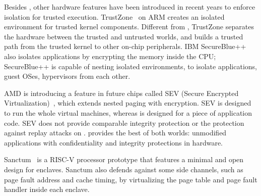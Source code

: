 Besides \sgx{}, other hardware features have been introduced in recent years to enforce isolation for trusted execution.
TrustZone~\cite{trustzone} on ARM
creates an isolated environment for trusted kernel components. 
Different from \sgx{}, TrustZone separates the hardware between the trusted and untrusted worlds,
and builds a trusted path from the trusted kernel to other on-chip peripherals.
IBM SecureBlue++~\cite{secureblue++} also isolates applications by encrypting the memory inside the CPU; SecureBlue++ is capable of nesting isolated environments, to isolate applications, guest OSes, hypervisors from each other.



AMD is introducing a feature in future chips called SEV (Secure Encrypted Virtualization)~\cite{amd-sme},
which extends nested paging with encryption.
SEV is designed to run the whole virtual machines, whereas \sgx{} is designed for 
a piece of application code.
SEV does not provide comparable integrity protection or the protection against replay attacks on \sgx{}.
\graphenesgx{} provides the best of both worlds: unmodified applications with confidentiality and integrity protections in hardware.




Sanctum~\cite{costan2016sanctum} is a RISC-V processor prototype 
that features a 
minimal and open design for enclaves.
Sanctum also defends against some side channels, such as page fault address and cache timing, by virtualizing the page table and page fault handler inside each enclave.


